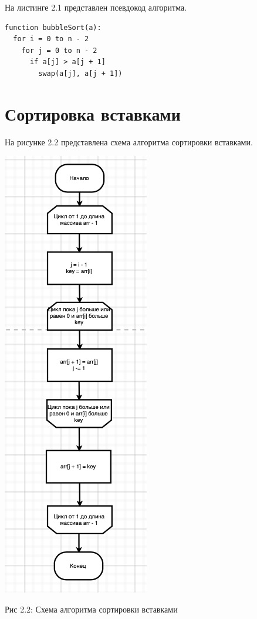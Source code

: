 \documentclass[12pt]{report}
\begin{document}
На листинге 2.1 представлен псевдокод алгоритма.

\begin{lstlisting}[label=some-code,caption=Псевдокод алгоритма сортировки пузырьком]
function bubbleSort(a):
  for i = 0 to n - 2
    for j = 0 to n - 2
      if a[j] > a[j + 1]
        swap(a[j], a[j + 1])
\end{lstlisting}

\newpage
\section{Сортировка вставками}

На рисунке 2.2 представлена схема алгоритма сортировки вставками.

\begin{center}
		\includegraphics[scale=1.2]{schema/InsertSort.png}
		
			Рис 2.2: Схема алгоритма сортировки вставками
\end{center}
\end{document}
